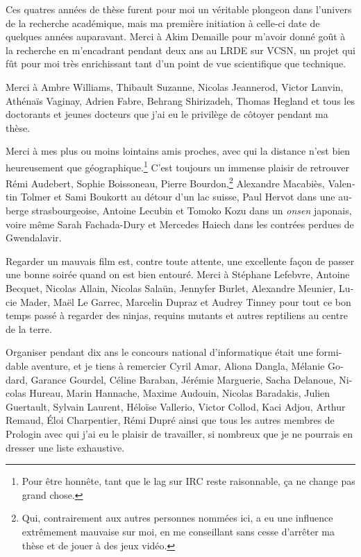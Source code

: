 \begin{otherlanguage}{french}
\begin{SingleSpace}
  Ces quatres années de thèse furent pour moi un véritable plongeon dans
  l'univers de la recherche académique, mais ma première initiation à celle-ci
  date de quelques années auparavant. Merci à Akim Demaille pour m'avoir donné
  goût à la recherche en m'encadrant pendant deux ans au LRDE sur VCSN, un
  projet qui fût pour moi très enrichissant tant d'un point de vue
  scientifique que technique.

  Merci à Ambre Williams, Thibault Suzanne, Nicolas Jeannerod, Victor Lanvin,
  Athénaïs Vaginay, Adrien Fabre, Behrang Shirizadeh, Thomas Hegland et tous
  les doctorants et jeunes docteurs que j'ai eu le privilège de côtoyer pendant
  ma thèse.

  Merci à mes plus ou moins lointains amis proches, avec qui la distance n'est
  bien heureusement que géographique.\footnote{Pour être honnête, tant que
  le lag sur IRC reste raisonnable, ça ne change pas grand chose.} C'est
  toujours un immense plaisir de retrouver Rémi Audebert, Sophie Boissoneau,
  Pierre Bourdon,\footnote{Qui, contrairement aux autres personnes nommées ici,
  a eu une influence extrêmement mauvaise sur moi, en me conseillant sans cesse
  d'arrêter ma thèse et de jouer à des jeux vidéo.} Alexandre Macabiès,
  Valentin Tolmer et Sami Boukortt au détour d'un lac suisse, Paul Hervot dans
  une auberge strasbourgeoise, Antoine Lecubin et Tomoko Kozu dans un
  \emph{onsen} japonais, voire même Sarah Fachada-Dury et Mercedes Haiech dans
  les contrées perdues de Gwendalavir.

  Regarder un mauvais film est, contre toute attente, une excellente façon de
  passer une bonne soirée quand on est bien entouré. Merci à Stéphane Lefebvre,
  Antoine Becquet, Nicolas Allain, Nicolas Salaün, Jennyfer Burlet, Alexandre
  Meunier, Lucie Mader, Maël Le Garrec, Marcelin Dupraz et Audrey Tinney pour
  tout ce bon temps passé à regarder des ninjas, requins mutants et autres
  reptiliens au centre de la terre.

  Organiser pendant dix ans le concours national d'informatique était une
  formidable aventure, et je tiens à remercier Cyril Amar, Aliona Dangla,
  Mélanie Godard, Garance Gourdel, Céline Baraban, Jérémie Marguerie, Sacha
  Delanoue, Nicolas Hureau, Marin Hannache, Maxime Audouin, Nicolas Baradakis,
  Julien Guertault, Sylvain Laurent, Héloïse Vallerio, Victor Collod, Kaci
  Adjou, Arthur Remaud, Éloi Charpentier, Rémi Dupré ainsi que tous les autres
  membres de Prologin avec qui j'ai eu le plaisir de travailler, si nombreux
  que je ne pourrais en dresser une liste exhaustive.


\end{SingleSpace}
\end{otherlanguage}
